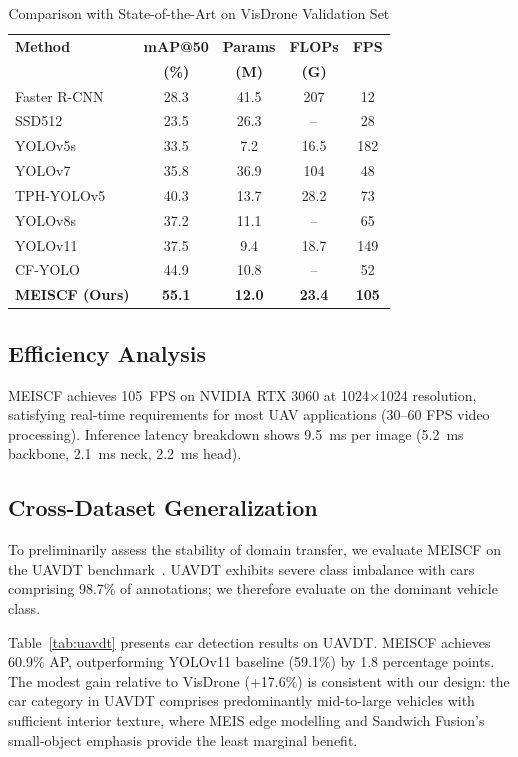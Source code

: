 \documentclass[preprint,12pt]{elsarticle}
\begin{document}
\begin{table}[t]
\centering
\caption{Comparison with State-of-the-Art on VisDrone Validation Set}
\label{tab:sota}
\small
\begin{tabular}{lcccc}
\toprule
\textbf{Method} & \textbf{mAP@50} & \textbf{Params} & \textbf{FLOPs} & \textbf{FPS} \\
& \textbf{(\%)} & \textbf{(M)} & \textbf{(G)} & \\
\midrule
Faster R-CNN~\cite{faster-rcnn} & 28.3 & 41.5 & 207 & 12 \\
SSD512~\cite{ssd} & 23.5 & 26.3 & -- & 28 \\
YOLOv5s~\cite{yolov5} & 33.5 & 7.2 & 16.5 & 182 \\
YOLOv7~\cite{yolov7} & 35.8 & 36.9 & 104 & 48 \\
TPH-YOLOv5~\cite{tph-yolo} & 40.3 & 13.7 & 28.2 & 73 \\
YOLOv8s~\cite{yolov8} & 37.2 & 11.1 & -- & 65 \\
YOLOv11~\cite{yolov11} & 37.5 & 9.4 & 18.7 & 149 \\
CF-YOLO~\cite{cf-yolo} & 44.9 & 10.8 & -- & 52 \\
\midrule
\textbf{MEISCF (Ours)} & \textbf{55.1} & \textbf{12.0} & \textbf{23.4} & \textbf{105} \\
\bottomrule
\end{tabular}
\end{table}

\subsection{Efficiency Analysis}

MEISCF achieves 105~FPS on NVIDIA RTX 3060 at 1024$\times$1024 resolution,
satisfying real-time requirements for most UAV applications (30--60 FPS video
processing). Inference latency breakdown shows 9.5~ms per image (5.2~ms backbone,
2.1~ms neck, 2.2~ms head).

\subsection{Cross-Dataset Generalization}

To preliminarily assess the stability of domain transfer, we evaluate MEISCF on
the UAVDT benchmark~\cite{uavdt}. UAVDT exhibits severe class imbalance with cars
comprising 98.7\% of annotations; we therefore evaluate on the dominant vehicle
class.

Table~\ref{tab:uavdt} presents car detection results on UAVDT. MEISCF achieves
60.9\% AP, outperforming YOLOv11 baseline (59.1\%) by 1.8 percentage points. The
modest gain relative to VisDrone (+17.6\%) is consistent with our design: the car
category in UAVDT comprises predominantly mid-to-large vehicles with sufficient
interior texture, where MEIS edge modelling and Sandwich Fusion's small-object
emphasis provide the least marginal benefit.
\end{document}
